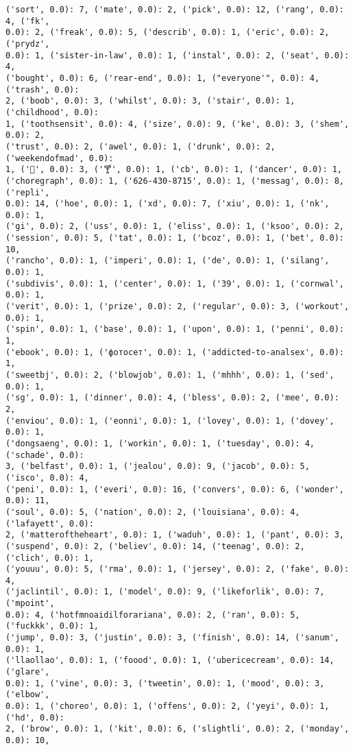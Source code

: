 \documentclass[11pt]{article}
\begin{document}
\begin{Verbatim}[commandchars=\\\{\}]
('sort', 0.0): 7, ('mate', 0.0): 2, ('pick', 0.0): 12, ('rang', 0.0): 4, ('fk',
0.0): 2, ('freak', 0.0): 5, ('describ', 0.0): 1, ('eric', 0.0): 2, ('prydz',
0.0): 1, ('sister-in-law', 0.0): 1, ('instal', 0.0): 2, ('seat', 0.0): 4,
('bought', 0.0): 6, ('rear-end', 0.0): 1, ("everyone'", 0.0): 4, ('trash', 0.0):
2, ('boob', 0.0): 3, ('whilst', 0.0): 3, ('stair', 0.0): 1, ('childhood', 0.0):
1, ('toothsensit', 0.0): 4, ('size', 0.0): 9, ('ke', 0.0): 3, ('shem', 0.0): 2,
('trust', 0.0): 2, ('awel', 0.0): 1, ('drunk', 0.0): 2, ('weekendofmad', 0.0):
1, ('🍹', 0.0): 3, ('🍸', 0.0): 1, ('cb', 0.0): 1, ('dancer', 0.0): 1,
('choregraph', 0.0): 1, ('626-430-8715', 0.0): 1, ('messag', 0.0): 8, ('repli',
0.0): 14, ('hoe', 0.0): 1, ('xd', 0.0): 7, ('xiu', 0.0): 1, ('nk', 0.0): 1,
('gi', 0.0): 2, ('uss', 0.0): 1, ('eliss', 0.0): 1, ('ksoo', 0.0): 2,
('session', 0.0): 5, ('tat', 0.0): 1, ('bcoz', 0.0): 1, ('bet', 0.0): 10,
('rancho', 0.0): 1, ('imperi', 0.0): 1, ('de', 0.0): 1, ('silang', 0.0): 1,
('subdivis', 0.0): 1, ('center', 0.0): 1, ('39', 0.0): 1, ('cornwal', 0.0): 1,
('verit', 0.0): 1, ('prize', 0.0): 2, ('regular', 0.0): 3, ('workout', 0.0): 1,
('spin', 0.0): 1, ('base', 0.0): 1, ('upon', 0.0): 1, ('penni', 0.0): 1,
('ebook', 0.0): 1, ('фотосет', 0.0): 1, ('addicted-to-analsex', 0.0): 1,
('sweetbj', 0.0): 2, ('blowjob', 0.0): 1, ('mhhh', 0.0): 1, ('sed', 0.0): 1,
('sg', 0.0): 1, ('dinner', 0.0): 4, ('bless', 0.0): 2, ('mee', 0.0): 2,
('enviou', 0.0): 1, ('eonni', 0.0): 1, ('lovey', 0.0): 1, ('dovey', 0.0): 1,
('dongsaeng', 0.0): 1, ('workin', 0.0): 1, ('tuesday', 0.0): 4, ('schade', 0.0):
3, ('belfast', 0.0): 1, ('jealou', 0.0): 9, ('jacob', 0.0): 5, ('isco', 0.0): 4,
('peni', 0.0): 1, ('everi', 0.0): 16, ('convers', 0.0): 6, ('wonder', 0.0): 11,
('soul', 0.0): 5, ('nation', 0.0): 2, ('louisiana', 0.0): 4, ('lafayett', 0.0):
2, ('matteroftheheart', 0.0): 1, ('waduh', 0.0): 1, ('pant', 0.0): 3,
('suspend', 0.0): 2, ('believ', 0.0): 14, ('teenag', 0.0): 2, ('clich', 0.0): 1,
('youuu', 0.0): 5, ('rma', 0.0): 1, ('jersey', 0.0): 2, ('fake', 0.0): 4,
('jaclintil', 0.0): 1, ('model', 0.0): 9, ('likeforlik', 0.0): 7, ('mpoint',
0.0): 4, ('hotfmnoaidilforariana', 0.0): 2, ('ran', 0.0): 5, ('fuckkk', 0.0): 1,
('jump', 0.0): 3, ('justin', 0.0): 3, ('finish', 0.0): 14, ('sanum', 0.0): 1,
('llaollao', 0.0): 1, ('foood', 0.0): 1, ('ubericecream', 0.0): 14, ('glare',
0.0): 1, ('vine', 0.0): 3, ('tweetin', 0.0): 1, ('mood', 0.0): 3, ('elbow',
0.0): 1, ('choreo', 0.0): 1, ('offens', 0.0): 2, ('yeyi', 0.0): 1, ('hd', 0.0):
2, ('brow', 0.0): 1, ('kit', 0.0): 6, ('slightli', 0.0): 2, ('monday', 0.0): 10,

\end{Verbatim}
\end{document}
